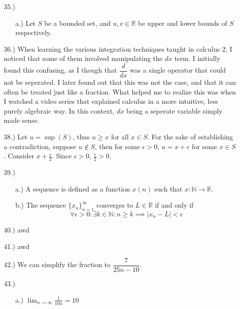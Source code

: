 \documentclass[12pt]{article}
\begin{document}
\begin{itemize}
    \item [35.)] \begin{itemize}
        \item [a.)] Let $S$ be a bounded set, and $u,v\in\mathbb{R}$ be upper and lower bounds of $S$ respectively. 
    \end{itemize}

    \item [36.)] When learning the various integration techniques taught in calculus 2, I noticed that some of them involved manipulating the $dx$ term. I initially found this confusing, as I though that $\dfrac{d}{dx}$ was a single operator that could not be seperated. I later found out that this was not the case, and that it can often be treated just like a fraction. What helped me to realize this was when I watched a video series that explained calculus in a more intuitive, less purely algebraic way. In this context, $dx$ being a seperate variable simply made sense.


    \item [38.)] Let $u=\sup(S)$, thus $u\geq x$ for all $x\in S$. For the sake of establishing a contradiction, suppose $u\notin S$, then for some $\epsilon>0$, $u=x+\epsilon$ for some $x\in S$. Consider $x+\frac{\epsilon}{2}$. Since $\epsilon>0$, $\frac{\epsilon}{2}>0$,

    \item [39.)] \begin{itemize}
        \item [a.)] A sequence is defined as a function $x(n)$ such that $x:\mathbb{N}\rightarrow\mathbb{R}$.

        \item [b.)] The sequence $\{x_n\}^\infty_{n=1}$ converges to $L\in\mathbb{R}$ if and only if
        \[\forall\epsilon>0:\exists k\in\mathbb{N}:n\geq k\implies\vert x_n-L\vert<\epsilon\]
    \end{itemize}

    \item [40.)] awd

    \item [41.)] awd

    \item [42.)] We can simplify the fraction to $\dfrac{7}{25n-10}$.

    \item [43.)] \begin{itemize}
        \item [a.)] $\displaystyle\lim_{n\to\infty}\frac{1}{10n}=10$


\end{itemize}
\end{itemize}
\end{document}
